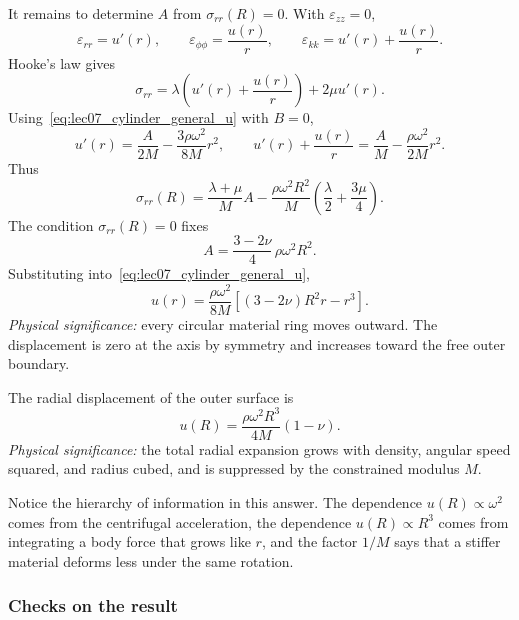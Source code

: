 \documentclass[../main.tex]{subfiles}
\begin{document}
It remains to determine $A$ from $\sigma_{rr}(R)=0$. With $\varepsilon_{zz}=0$,
\[
    \varepsilon_{rr}=u'(r),
    \qquad
    \varepsilon_{\phi\phi}=\frac{u(r)}{r},
    \qquad
    \varepsilon_{kk}=u'(r)+\frac{u(r)}{r}.
\]
Hooke's law gives
\begin{equation}
    \sigma_{rr}
    = \lambda\left(u'(r)+\frac{u(r)}{r}\right)
      +2\mu u'(r).
    \label{eq:lec07_cylinder_sigma_rr}
\end{equation}
Using~\eqref{eq:lec07_cylinder_general_u} with $B=0$,
\[
    u'(r)=\frac{A}{2M}-\frac{3\rho\omega^2}{8M}r^2,
    \qquad
    u'(r)+\frac{u(r)}{r}
    =\frac{A}{M}-\frac{\rho\omega^2}{2M}r^2.
\]
Thus
\[
    \sigma_{rr}(R)
    =\frac{\lambda+\mu}{M}A
      -\frac{\rho\omega^2R^2}{M}\left(\frac{\lambda}{2}+\frac{3\mu}{4}\right).
\]
The condition $\sigma_{rr}(R)=0$ fixes
\begin{equation}
    A=\frac{3-2\nu}{4}\,\rho\omega^2R^2.
    \label{eq:lec07_cylinder_A_value}
\end{equation}
Substituting into~\eqref{eq:lec07_cylinder_general_u},
\begin{equation}
    \boxed{
    u(r)=\frac{\rho\omega^2}{8M}
    \left[(3-2\nu)R^2r-r^3\right].}
    \label{eq:lec07_cylinder_displacement}
\end{equation}
\textit{Physical significance:} every circular material ring moves outward. The displacement is zero at the axis by symmetry and increases toward the free outer boundary.

The radial displacement of the outer surface is
\begin{equation}
    \boxed{
    u(R)=\frac{\rho\omega^2R^3}{4M}(1-\nu).}
    \label{eq:lec07_cylinder_edge_displacement}
\end{equation}
\textit{Physical significance:} the total radial expansion grows with density, angular speed squared, and radius cubed, and is suppressed by the constrained modulus $M$.

Notice the hierarchy of information in this answer. The dependence $u(R)\propto\omega^2$ comes from the centrifugal acceleration, the dependence $u(R)\propto R^3$ comes from integrating a body force that grows like $r$, and the factor $1/M$ says that a stiffer material deforms less under the same rotation.

\subsubsection*{Checks on the result}
\end{document}
